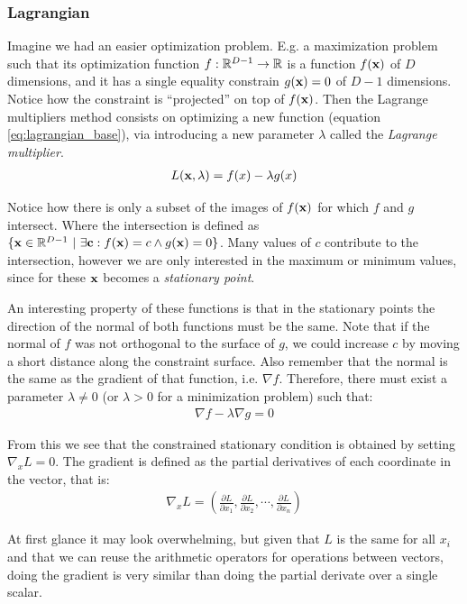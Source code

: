 \subsubsection*{Lagrangian}

Imagine we had an easier optimization problem. E.g. a maximization pro\-blem such that its optimization function $f : \mathbb{R}^{D-1} \rightarrow \mathbb{R}$ is a function $f(\mathbf{x})$ of $D$ dimensions, and it has a single equality constrain $g(\mathbf{x}) = 0$ of $D - 1$ dimensions. Notice how the constraint is “projected” on top of $f(\mathbf{x})$. Then the Lagrange multipliers method consists on optimizing a new function (equation \ref{eq:lagrangian_base}), via introducing a new pa\-ram\-e\-ter $\lambda$ called the \emph{Lagrange multiplier}. 
\begin{align}\label{eq:lagrangian_base} 
    L(\mathbf{x}, \lambda) = f(x) - \lambda g(x)
\end{align}

Notice how there is only a subset of the images of $f(\mathbf{x})$ for which $f$ and $g$ inter\-sect. Where the intersection is defined as $\{\mathbf{x} \in \mathbb{R}^{D-1}\ |\ \exists \mathbf{c} : f(\mathbf{x}) = c \land g(\mathbf{x}) = 0\}$. Many values of $c$ contribute to the intersection, however we are only interested in the maximum or minimum values, since for these $\mathbf{x}$ becomes a \emph{stationary point}.

An interesting property of these functions is that in the stationary points the di\-rec\-tion of the normal of both functions must be the same. Note that if the normal of $f$ was not orthogonal to the surface of $g$, we could increase $c$ by moving a short distance along the constraint surface. Also remember that the normal is the same as the gradient of that function, i.e. $\nabla f$. Therefore, there must exist a parameter $\lambda \neq 0$ (or $\lambda > 0$ for a minimization problem) such that:
\begin{align}
    \nabla f - \lambda \nabla g = 0
\end{align}

From this we see that the constrained stationary condition is obtained by setting $\nabla_x L = 0$. The gradient is defined as the partial derivatives of each coordinate in the vector, that is:
\begin{align*}
    \nabla_x L = \left( \frac{\partial L}{\partial x_1}, \frac{\partial L}{\partial x_2}, \cdots, \frac{\partial L}{\partial x_n} \right)
\end{align*}

At first glance it may look overwhelming, but given that $L$ is the same for all $x_i$ and that we can reuse the arithmetic operators for operations between vectors, doing the gradient is very similar than doing the partial derivate over a single scalar. 

